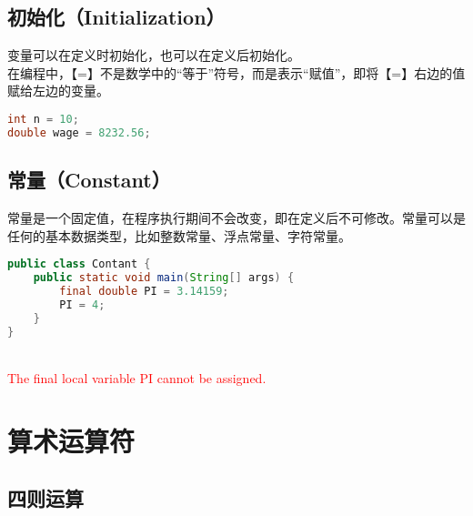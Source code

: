 \subsection{初始化（Initialization）}

变量可以在定义时初始化，也可以在定义后初始化。 \\

在编程中，【=】不是数学中的“等于”符号，而是表示“赋值”，即将【=】右边的值赋给左边的变量。

\begin{lstlisting}[language=Java]
int n = 10;
double wage = 8232.56;
\end{lstlisting}

\subsection{常量（Constant）}

常量是一个固定值，在程序执行期间不会改变，即在定义后不可修改。常量可以是任何的基本数据类型，比如整数常量、浮点常量、字符常量。 \\

\begin{lstlisting}[language=Java]
public class Contant {
    public static void main(String[] args) {
        final double PI = 3.14159;
        PI = 4;
    }
}
\end{lstlisting}

\begin{tcolorbox}
	 \\
	\textcolor{red}{The final local variable PI cannot be assigned.}
\end{tcolorbox}

\section{算术运算符}

\subsection{四则运算}

\begin{table}[H]
	\centering
	\caption{四则运算}
\end{table}

